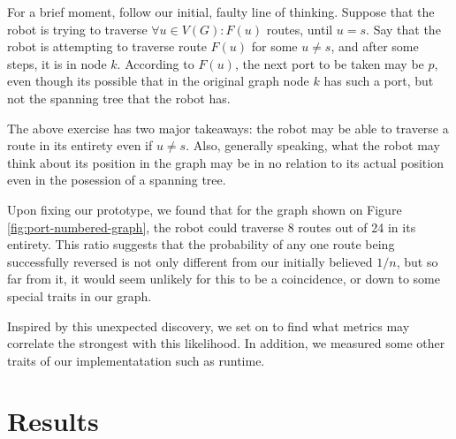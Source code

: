 \documentclass{article}
\begin{document}
For a brief moment, follow our initial, faulty line of thinking. Suppose that the robot is trying to traverse $\forall u\in V(G): F(u)$ routes, until $u = s$. Say that the robot is attempting to traverse route $F(u)$ for some $u \neq s$, and after some steps, it is in node $k$. According to $F(u)$, the next port to be taken may be $p$, even though its possible that in the original graph node $k$ has such a port, but not the spanning tree that the robot has.

The above exercise has two major takeaways: the robot may be able to traverse a route in its entirety even if $u \neq s$. Also, generally speaking, what the robot may think about its position in the graph may be in no relation to its actual position even in the posession of a spanning tree.

Upon fixing our prototype, we found that for the graph shown on Figure \ref{fig:port-numbered-graph}, the robot could traverse 8 routes out of 24 in its entirety. This ratio suggests that the probability of any one route being successfully reversed is not only different from our initially believed $1/n$, but so far from it, it would seem unlikely for this to be a coincidence, or down to some special traits in our graph.

Inspired by this unexpected discovery, we set on to find what metrics may correlate the strongest with this likelihood. In addition, we measured some other traits of our implementatation such as runtime.

\section{Results}
\label{sec:results}

\end{document}
